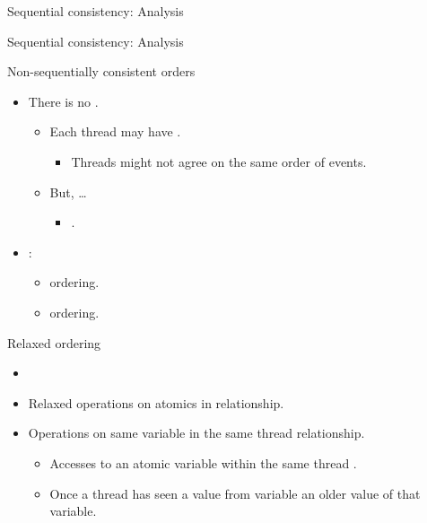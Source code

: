 \begin{frame}[t]{Sequential consistency: Analysis}

\end{frame}

\begin{frame}[t]{Sequential consistency: Analysis}

\end{frame}

\begin{frame}[t,fragile]{Non-sequentially consistent orders}
\begin{itemize}
\item There is no .
  \begin{itemize}
    \item Each thread may have .
      \begin{itemize}
        \item Threads might not agree on the same order of events.
      \end{itemize}

    \pause
    \item But, \ldots
      \begin{itemize}
        \item {}.
      \end{itemize}
  \end{itemize}
\item {}:
  \begin{itemize}
    \item {} ordering.
    \item {} ordering.
  \end{itemize}
\end{itemize}
\end{frame}

\begin{frame}[t]{Relaxed ordering}
\begin{itemize}
\item {}
  \item Relaxed operations on atomics  in  relationship.

  \item Operations on same variable in the same thread   relationship.
    \begin{itemize}
      \item Accesses to an atomic variable within the same thread .
      \item Once a thread has seen a value from variable  an older value of that variable.
    \end{itemize}
\end{itemize}
\end{frame}

